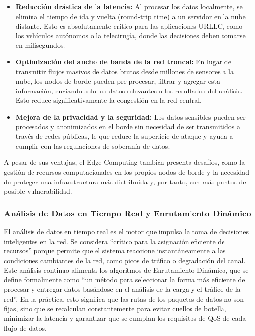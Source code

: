 \documentclass[12pt,a4paper]{article}
\begin{document}
\begin{itemize}
    \item \textbf{Reducción drástica de la latencia:} Al procesar los datos localmente, se elimina el tiempo de ida y vuelta (round-trip time) a un servidor en la nube distante. Esto es absolutamente crítico para las aplicaciones URLLC, como los vehículos autónomos o la telecirugía, donde las decisiones deben tomarse en milisegundos\cite{ref23}.
    
    \item \textbf{Optimización del ancho de banda de la red troncal:} En lugar de transmitir flujos masivos de datos brutos desde millones de sensores a la nube, los nodos de borde pueden pre-procesar, filtrar y agregar esta información, enviando solo los datos relevantes o los resultados del análisis. Esto reduce significativamente la congestión en la red central\cite{ref24}.
    
    \item \textbf{Mejora de la privacidad y la seguridad:} Los datos sensibles pueden ser procesados y anonimizados en el borde sin necesidad de ser transmitidos a través de redes públicas, lo que reduce la superficie de ataque y ayuda a cumplir con las regulaciones de soberanía de datos\cite{ref23}.
\end{itemize}

A pesar de sus ventajas, el Edge Computing también presenta desafíos, como la gestión de recursos computacionales en los propios nodos de borde y la necesidad de proteger una infraestructura más distribuida y, por tanto, con más puntos de posible vulnerabilidad\cite{ref23}.

\subsubsection{Análisis de Datos en Tiempo Real y Enrutamiento Dinámico}

El análisis de datos en tiempo real es el motor que impulsa la toma de decisiones inteligentes en la red. Se considera ``crítico para la asignación eficiente de recursos'' porque permite que el sistema reaccione instantáneamente a las condiciones cambiantes de la red, como picos de tráfico o degradación del canal\cite{ref9}. Este análisis continuo alimenta los algoritmos de Enrutamiento Dinámico, que se define formalmente como ``un método para seleccionar la forma más eficiente de procesar y entregar datos basándose en el análisis de la carga y el tráfico de la red''. En la práctica, esto significa que las rutas de los paquetes de datos no son fijas, sino que se recalculan constantemente para evitar cuellos de botella, minimizar la latencia y garantizar que se cumplan los requisitos de QoS de cada flujo de datos\cite{ref20}.
\end{document}
